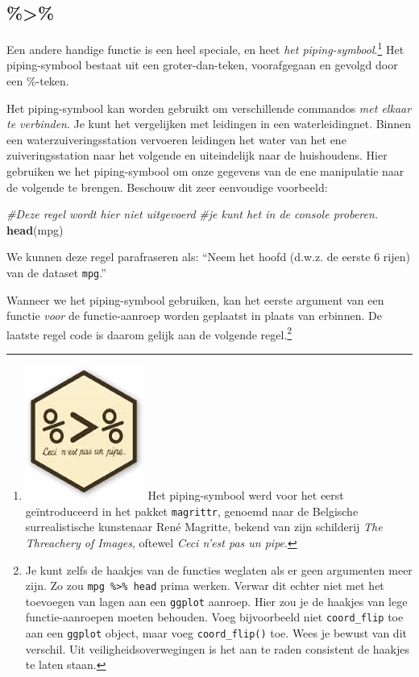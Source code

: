 \documentclass[]{tufte-book}
\newenvironment{Shaded}{}{}
\newcommand{\CommentTok}[1]{\textcolor[rgb]{0.38,0.63,0.69}{\textit{#1}}}
\newcommand{\KeywordTok}[1]{\textcolor[rgb]{0.00,0.44,0.13}{\textbf{#1}}}
\newcommand{\NormalTok}[1]{#1}
\begin{document}
\hypertarget{section}{%
\subsection{\%\textgreater\%}\label{section}}

Een andere handige functie is een heel speciale, en heet \emph{het piping-symbool}.\footnote{\includegraphics{images/pipe.jpg} Het piping-symbool werd voor het eerst geïntroduceerd in het pakket \texttt{magrittr}, genoemd naar de Belgische surrealistische kunstenaar René Magritte, bekend van zijn schilderij \emph{The Threachery of Images}, oftewel \emph{Ceci n'est pas un pipe}.} Het piping-symbool bestaat uit een groter-dan-teken, voorafgegaan en gevolgd door een \%-teken.

Het piping-symbool kan worden gebruikt om verschillende commandos \emph{met elkaar te verbinden}. Je kunt het vergelijken met leidingen in een waterleidingnet. Binnen een waterzuiveringsstation vervoeren leidingen het water van het ene zuiveringsstation naar het volgende en uiteindelijk naar de huishoudens. Hier gebruiken we het piping-symbool om onze gegevens van de ene manipulatie naar de volgende te brengen. Beschouw dit zeer eenvoudige voorbeeld:

\begin{Shaded}
\begin{Highlighting}[]
\CommentTok{#Deze regel wordt hier niet uitgevoerd }
\CommentTok{#je kunt het in de console proberen.}
\KeywordTok{head}\NormalTok{(mpg)}
\end{Highlighting}
\end{Shaded}

We kunnen deze regel parafraseren als: ``Neem het hoofd (d.w.z. de eerste 6 rijen) van de dataset \texttt{mpg}.''

Wanneer we het piping-symbool gebruiken, kan het eerste argument van een functie \emph{voor} de functie-aanroep worden geplaatst in plaats van erbinnen. De laatste regel code is daarom gelijk aan de volgende regel.\footnote{Je kunt zelfs de haakjes van de functies weglaten als er geen argumenten meer zijn. Zo zou \texttt{mpg\ \%\textgreater{}\%\ head} prima werken. Verwar dit echter niet met het toevoegen van lagen aan een \texttt{ggplot} aanroep. Hier zou je de haakjes van lege functie-aanroepen moeten behouden. Voeg bijvoorbeeld niet \texttt{coord\_flip} toe aan een \texttt{ggplot} object, maar voeg \texttt{coord\_flip()} toe. Wees je bewust van dit verschil. Uit veiligheidsoverwegingen is het aan te raden consistent de haakjes te laten staan.}
\end{document}
